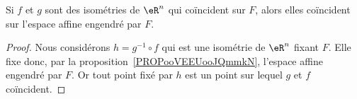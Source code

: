 \begin{corollary}       \label{CORooZHZZooDgTzsW}
	Si \( f\) et \( g\) sont des isométries de \( \eR^n\) qui coïncident sur \( F\), alors elles coïncident sur l'espace affine engendré par \( F\).
\end{corollary}

\begin{proof}
	Nous considérons \( h=g^{-1}\circ f\) qui est une isométrie de \( \eR^n\) fixant \( F\). Elle fixe donc, par la proposition~\ref{PROPooVEEUooJQmmkN}, l'espace affine engendré par \( F\). Or tout point fixé par \( h\) est un point sur lequel \( g\) et \( f\) coïncident.
\end{proof}
